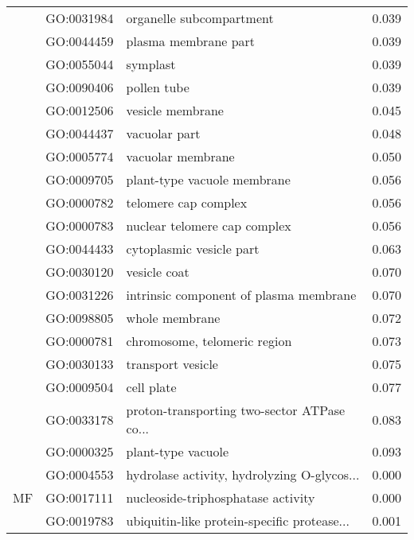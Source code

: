 \begin{longtable}{lllr}
   & GO:0031984 &                     organelle subcompartment &         0.039 \\
   & GO:0044459 &                         plasma membrane part &         0.039 \\
   & GO:0055044 &                                     symplast &         0.039 \\
   & GO:0090406 &                                  pollen tube &         0.039 \\
   & GO:0012506 &                             vesicle membrane &         0.045 \\
   & GO:0044437 &                                vacuolar part &         0.048 \\
   & GO:0005774 &                            vacuolar membrane &         0.050 \\
   & GO:0009705 &                  plant-type vacuole membrane &         0.056 \\
   & GO:0000782 &                         telomere cap complex &         0.056 \\
   & GO:0000783 &                 nuclear telomere cap complex &         0.056 \\
   & GO:0044433 &                     cytoplasmic vesicle part &         0.063 \\
   & GO:0030120 &                                 vesicle coat &         0.070 \\
   & GO:0031226 &       intrinsic component of plasma membrane &         0.070 \\
   & GO:0098805 &                               whole membrane &         0.072 \\
   & GO:0000781 &                 chromosome, telomeric region &         0.073 \\
   & GO:0030133 &                            transport vesicle &         0.075 \\
   & GO:0009504 &                                   cell plate &         0.077 \\
   & GO:0033178 &  proton-transporting two-sector ATPase co... &         0.083 \\
   & GO:0000325 &                           plant-type vacuole &         0.093 \\
\cline{1-4}
\multirow{61}{*}{MF} & GO:0004553 &  hydrolase activity, hydrolyzing O-glycos... &         0.000 \\
   & GO:0017111 &           nucleoside-triphosphatase activity &         0.000 \\
   & GO:0019783 &  ubiquitin-like protein-specific protease... &         0.001 \\

\end{longtable}
